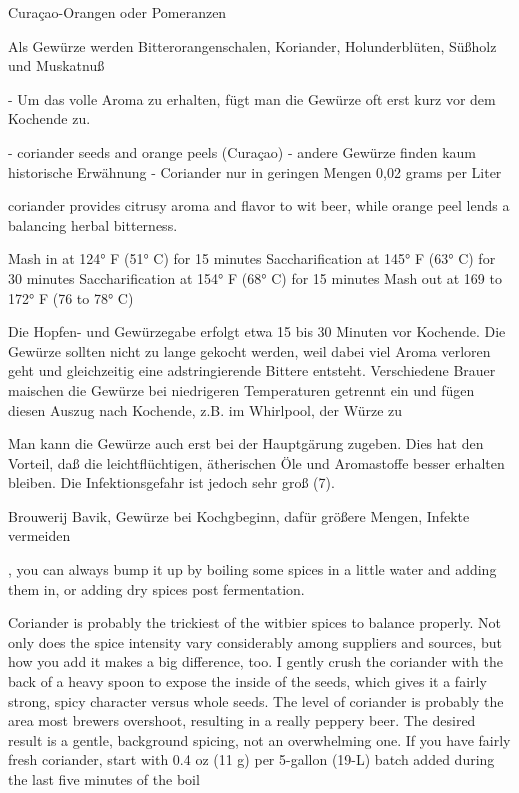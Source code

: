 \documentclass[a4paper,parskip=half]{scrartcl}
\begin{document}
Curaçao-Orangen oder Pomeranzen


\parencite[1]{Strottner1999}
Als Gewürze werden
Bitterorangenschalen,
Koriander,
Holunderblüten,
Süßholz
und
Muskatnuß

\parencite[2]{Strottner1999}
- Um das volle Aroma zu erhalten, fügt man die Gewürze oft erst kurz vor dem
Kochende zu.

\parencite[40]{Hieronymus2010}
- coriander seeds and orange peels (Curaçao)
- andere Gewürze finden kaum historische Erwähnung
- Coriander nur in geringen Mengen 0,02 grams per Liter

\parencite[73]{Hieronymus2010}
coriander provides citrusy aroma and flavor
to wit beer, while orange peel lends a balancing herbal bitterness.

Mash in at 124° F (51° C) for 15 minutes
Saccharification at 145° F (63° C) for 30 minutes
Saccharification at 154° F (68° C) for 15 minutes
Mash out at 169 to 172° F (76 to 78° C)

\parencite[17]{Strottner1999}
Die Hopfen- und Gewürzegabe erfolgt etwa 15 bis 30 Minuten vor Kochende.
Die Gewürze sollten nicht zu lange gekocht werden, weil dabei viel Aroma verloren
geht und gleichzeitig eine adstringierende Bittere entsteht. Verschiedene Brauer
maischen die Gewürze bei niedrigeren Temperaturen getrennt ein und fügen diesen
Auszug nach Kochende, z.B. im Whirlpool, der Würze zu

\parencite[18]{Strottner1999}
Man kann die Gewürze auch erst bei der Hauptgärung zugeben. Dies hat den Vorteil,
daß die leichtflüchtigen, ätherischen Öle und Aromastoffe besser erhalten bleiben.
Die Infektionsgefahr ist jedoch sehr groß (7).

\parencite[62]{Hieronymus2010}
Brouwerij Bavik, Gewürze bei Kochgbeginn, dafür größere Mengen, Infekte vermeiden

\parencite{Zainasheff2007}
, you can always bump it up by boiling some spices in a little water and adding them in, or adding dry
spices post fermentation.

Coriander is probably the trickiest of the witbier spices to balance properly. Not only does the spice intensity
vary considerably among suppliers and sources, but how you add it makes a big difference, too. I gently crush
the coriander with the back of a heavy spoon to expose the inside of the seeds, which gives it a fairly strong,
spicy character versus whole seeds. The level of coriander is probably the area most brewers overshoot,
resulting in a really peppery beer. The desired result is a gentle, background spicing, not an overwhelming one.
If you have fairly fresh coriander, start with 0.4 oz (11 g) per 5-gallon (19-L) batch added during the last five
minutes of the boil
\end{document}

